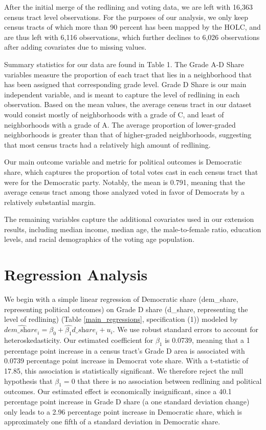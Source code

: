 \documentclass{eco_375_paper}
\begin{document}
After the initial merge of the redlining and voting data, we are left with 16,363 census tract level observations. For the purposes of our analysis, we only keep census tracts of which more than 90 percent has been mapped by the HOLC, and are thus left with 6,116 observations, which further declines to 6,026 observations after adding covariates due to missing values.

Summary statistics for our data are found in Table 1. The Grade A-D Share variables measure the proportion of each tract that lies in a neighborhood that has been assigned that corresponding grade level. Grade D Share is our main independent variable, and is meant to capture the level of redlining in each observation. Based on the mean values, the average census tract in our dataset would consist mostly of neighborhoods with a grade of C, and least of neighborhoods with a grade of A. The average proportion of lower-graded neighborhoods is greater than that of higher-graded neighborhoods, suggesting that most census tracts had a relatively high amount of redlining.

Our main outcome variable and metric for political outcomes is Democratic share, which captures the proportion of total votes cast in each census tract that were for the Democratic party. Notably, the mean is 0.791, meaning that the average census tract among those analyzed voted in favor of Democrats by a relatively substantial margin.

The remaining variables capture the additional covariates used in our extension results, including median income, median age, the male-to-female ratio, education levels, and racial demographics of the voting age population. 


\section*{Regression Analysis}
We begin with a simple linear regression of Democratic share (dem\_share, representing political outcomes) on Grade D share (d\_share, representing the level of redlining) (Table \ref{main_regressions}, specification (1)) modeled by $\hat{\textit{dem\_share}_i} = \hat{\beta_0} + \hat{\beta_1}{\textit{d\_share}_i} + u_i$. We use robust standard errors to account for heteroskedasticity. Our estimated coefficient for $\beta_1$ is 0.0739, meaning that a 1 percentage point increase in a census tract’s Grade D area is associated with 0.0739 percentage point increase in Democrat vote share. With a t-statistic of 17.85, this association is statistically significant. We therefore reject the null hypothesis that $\beta_1 = 0$ that there is no association between redlining and political outcomes. Our estimated effect is economically insignificant, since a 40.1 percentage point increase in Grade D share (a one standard deviation change) only leads to a 2.96 percentage point increase in Democratic share, which is approximately one fifth of a standard deviation in Democratic share.
\end{document}
